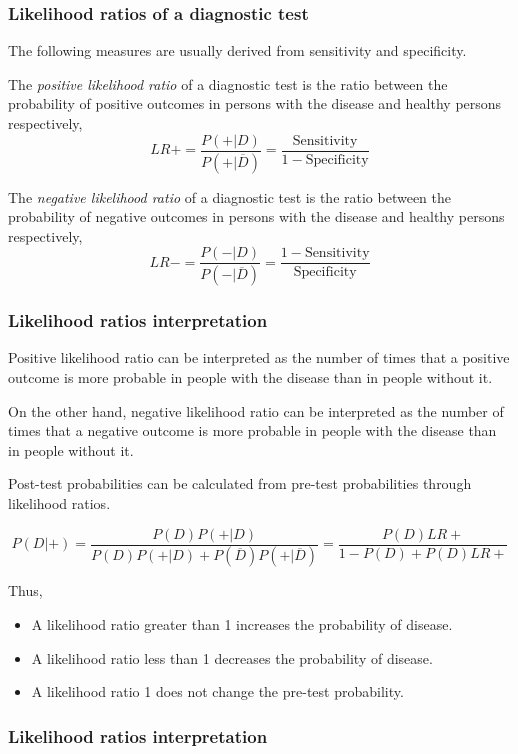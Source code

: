 \begin{frame}
\frametitle{Likelihood ratios of a diagnostic test}
The following measures are usually derived from sensitivity and specificity.
\begin{definition}
The \emph{positive likelihood ratio} of a diagnostic test is the ratio between the probability of positive outcomes in
persons with the disease and healthy persons respectively,
\[
LR+=\frac{P(+|D)}{P(+|\overline{D})} = \frac{\mbox{Sensitivity}}{1-\mbox{Specificity}}
\]
\end{definition}

\begin{definition}
The \emph{negative likelihood ratio} of a diagnostic test is the ratio between the probability of negative outcomes in
persons with the disease and healthy persons respectively,
\[
LR-=\frac{P(-|D)}{P(-|\overline{D})} = \frac{1-\mbox{Sensitivity}}{\mbox{Specificity}}
\]
\end{definition}
\end{frame}


\begin{frame}
\frametitle{Likelihood ratios interpretation}
Positive likelihood ratio can be interpreted as the number of times that a positive outcome is more probable in people
with the disease than in people without it. 

On the other hand, negative likelihood ratio can be interpreted as the number of times that a negative outcome is more
probable in people with the disease than in people without it. 

Post-test probabilities can be calculated from pre-test probabilities through likelihood ratios.

\[
P(D|+) = \frac{P(D)P(+|D)}{P(D)P(+|D)+P(\overline{D})P(+|\overline{D})} = \frac{P(D)LR+}{1-P(D)+P(D)LR+}
\]

Thus, 
\begin{itemize}
\item A likelihood ratio greater than 1 increases the probability of disease.
\item A likelihood ratio less than 1 decreases the probability of disease.
\item A likelihood ratio 1 does not change the pre-test probability. 
\end{itemize}
\end{frame}


\begin{frame}
\frametitle{Likelihood ratios interpretation}
\begin{center}
\end{center}
\end{frame}
